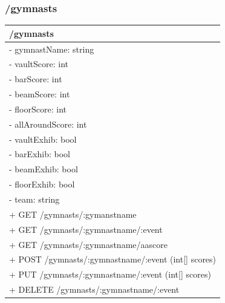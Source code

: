 \documentclass[letterpaper,10pt,draftclsnofoot,onecolumn,]{article}
\begin{document}
\subsubsection{/gymnasts}
\begin{center}
    \begin{tabular}{| p{20em} |}
    \hline
    \textbf{/gymnasts} \\
    \hline
    - gymnastName: string \\
    - vaultScore: int \\
    - barScore: int \\
    - beamScore: int \\
    - floorScore: int \\
    - allAroundScore: int \\
    - vaultExhib: bool \\
    - barExhib: bool \\
    - beamExhib: bool \\
    - floorExhib: bool \\
    - team: string \\
    \hline
    + GET /gymnasts/:gymanstname \\
    + GET /gymnasts/:gymnastname/:event \\
    + GET /gymnasts/:gymnastname/aascore \\
    + POST /gymnasts/:gymnastname/:event (int[] scores) \\
    + PUT /gymnasts/:gymnastname/:event (int[] scores) \\
    + DELETE /gymnasts/:gymnastname/:event \\
    \hline
    \end{tabular}
\end{center}
\end{document}

